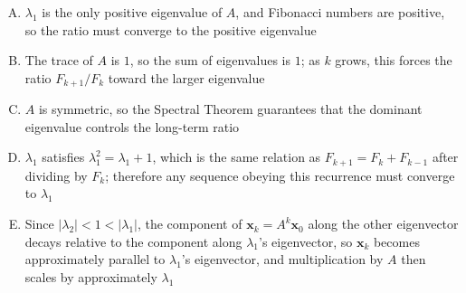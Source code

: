 \documentclass[12pt]{amsart}
\begin{document}
\begin{enumerate}[(A)]
\item $\lambda_1$ is the only positive eigenvalue of $A$, and Fibonacci 
      numbers are positive, so the ratio must converge to the positive 
      eigenvalue
\item The trace of $A$ is $1$, so the sum of eigenvalues is $1$; as 
      $k$ grows, this forces the ratio $F_{k+1}/F_k$ toward the larger 
      eigenvalue
\item $A$ is symmetric, so the Spectral Theorem guarantees that the 
      dominant eigenvalue controls the long-term ratio
\item $\lambda_1$ satisfies $\lambda_1^2 = \lambda_1 + 1$, which is the same 
      relation as $F_{k+1} = F_k + F_{k-1}$ after dividing by $F_k$; 
      therefore any sequence obeying this recurrence must converge to 
      $\lambda_1$
\item Since $|\lambda_2| < 1 < |\lambda_1|$, the component of 
      $\mathbf{x}_k = A^k\mathbf{x}_0$ along the other 
      eigenvector decays relative to the component along $\lambda_1$'s 
      eigenvector, so $\mathbf{x}_k$ becomes approximately parallel to 
      $\lambda_1$'s eigenvector, and multiplication by $A$ then scales by 
      approximately $\lambda_1$
\end{enumerate}
\end{document}
